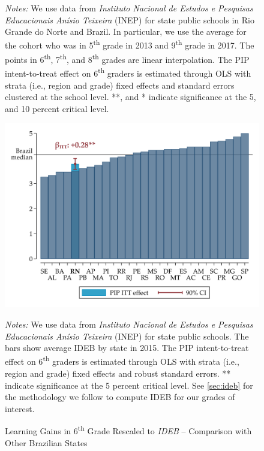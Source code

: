 \documentclass[11pt,a4paper]{article}
\begin{document}
\begin{figure}[ht!]
		\begin{minipage}{0.825\textwidth}
			\small{\textit{Notes:} We use data from \textit{Instituto Nacional de Estudos e Pesquisas Educacionais Anísio Teixeira} (INEP) for state public schools in Rio Grande do Norte and Brazil. In particular, we use the average for the cohort who was in 5\textsuperscript{th} grade in 2013 and 9\textsuperscript{th} grade in 2017. The points in 6\textsuperscript{th}, 7\textsuperscript{th}, and 8\textsuperscript{th} grades are linear interpolation. The PIP intent-to-treat effect on 6\textsuperscript{th} graders is estimated through OLS with strata (i.e., region and grade) fixed effects and standard errors clustered at the school level. **, and * indicate significance at the 5, and 10 percent critical level.}
		\end{minipage}
		
	\end{figure}
	
	\vfill
	\begin{figure}[ht!]
		\centering
		\caption{Learning Gains in 6\textsuperscript{th} Grade Rescaled to \textit{IDEB} -- Comparison with Other Brazilian States}
		
		\includegraphics[width=14cm]{DataWork/Output/Figures/figA5-itt_IDEB.png}
		\label{fig:itt_IDEB}
		
		\begin{minipage}{0.825\textwidth}
			\small{\textit{Notes:} We use data from \textit{Instituto Nacional de Estudos e Pesquisas Educacionais Anísio Teixeira} (INEP) for state public schools. The bars show average IDEB by state in 2015. The PIP intent-to-treat effect on 6\textsuperscript{th} graders is estimated through OLS with strata (i.e., region and grade) fixed effects and robust standard errors. ** indicate significance at the 5 percent critical level. See \ref{sec:ideb} for the methodology we follow to compute IDEB for our grades of interest.}
		\end{minipage}
		
	\end{figure}
	\vfill
	
\end{document}
